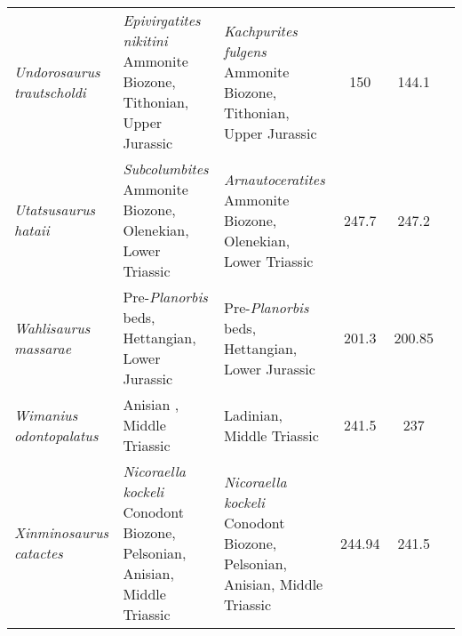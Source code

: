 \begin{longtabu}{>{\itshape}lXXSSl}
	Undorosaurus trautscholdi                            & \emph{Epivirgatites nikitini} Ammonite Biozone, Tithonian, Upper Jurassic                                                          & \emph{Kachpurites fulgens} Ammonite Biozone, Tithonian, Upper Jurassic                                                             & 150                      & 144.1                    & \cite{Arkhangelsky2014} \\               
	Utatsusaurus hataii                                  & \emph{Subcolumbites} Ammonite Biozone, Olenekian, Lower Triassic                                                                   & \emph{Arnautoceratites} Ammonite Biozone, Olenekian, Lower Triassic                                                                & 247.7                    & 247.2                    & \cite{Shikama1978} \\                    
	Wahlisaurus massarae                                 & Pre-\emph{Planorbis} beds, Hettangian, Lower Jurassic                                                                              & Pre-\emph{Planorbis} beds, Hettangian, Lower Jurassic                                                                              & 201.3                    & 200.85                   & \cite{Lomax2016} \\                      
	Wimanius odontopalatus                               & Anisian , Middle Triassic                                                                                                          & Ladinian, Middle Triassic                                                                                                          & 241.5                    & 237                      & \cite{Maisch1998a} \\                    
	Xinminosaurus catactes                               & \emph{Nicoraella kockeli} Conodont Biozone, Pelsonian, Anisian, Middle Triassic                                                    & \emph{Nicoraella kockeli} Conodont Biozone, Pelsonian, Anisian, Middle Triassic                                                    & 244.94                   & 241.5                    & \cite{Jiang2008a} \\                     
\end{longtabu}                                        

% 